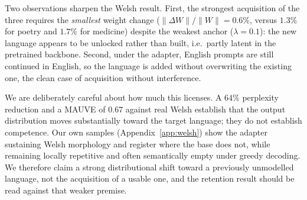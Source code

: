 \documentclass{article}
\begin{document}
Two observations sharpen the Welsh result. First, the strongest acquisition of
the three requires the \emph{smallest} weight change
($\lVert\Delta W\rVert/\lVert W\rVert=0.6\%$, versus $1.3\%$ for poetry and
$1.7\%$ for medicine) despite the weakest anchor ($\lambda=0.1$): the new
language appears to be unlocked rather than built, i.e.\ partly latent in the
pretrained backbone. Second, under the adapter, English prompts are still
continued in English, so the language is added without overwriting the existing
one, the clean case of acquisition without interference.

We are deliberately careful about how much this licenses. A $64\%$ perplexity
reduction and a MAUVE of $0.67$ against real Welsh establish that the output
distribution moves substantially toward the target language; they do not
establish competence. Our own samples (Appendix~\ref{app:welsh}) show the adapter
sustaining Welsh morphology and register where the base does not, while remaining
locally repetitive and often semantically empty under greedy decoding. We
therefore claim a strong distributional shift toward a previously unmodelled
language, not the acquisition of a usable one, and the retention result should be
read against that weaker premise.
\end{document}

